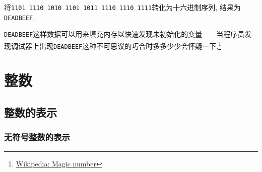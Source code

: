 \documentclass{ctexart}
\def\binaryseq#1{{\texttt{#1}}}
\begin{document}
\begin{sample}
    \begin{ex}
        将\binaryseq{1101 1110 1010 1101 1011 1110 1110 1111}转化为十六进制序列, 结果为\binaryseq{DEADBEEF}.
    \end{ex}
\end{sample}
\begin{remark}
    \binaryseq{DEADBEEF}这样数据可以用来填充内存以快速发现未初始化的变量——当程序员发现调试器上出现\binaryseq{DEADBEEF}这种不可思议的巧合时多多少少会怀疑一下.\footnote{\href{https://en.wikipedia.org/wiki/Magic_number_(programming)\#Magic_debug_values}{Wikipedia: Magic number}}
\end{remark}




\section{整数} %
\label{sec:整数}

\subsection{整数的表示} %
\label{sub:整数的表示}

\subsubsection{无符号整数的表示} %
\label{ssub:无符号整数的表示}
\end{document}
